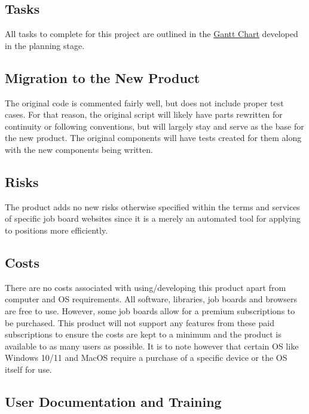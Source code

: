 \documentclass[12pt, titlepage]{article}
\begin{document}
\subsection{Tasks}

All tasks to complete for this project are outlined in the 
\href{https://gitlab.cas.mcmaster.ca/jamesong/application_3xa3_l01_grp05/-/tree/main/ProjectSchedule}{Gantt Chart} developed in the planning stage. 

\subsection{Migration to the New Product}

The original code is commented fairly well, but does not include proper test cases. For that reason, the original script will likely have parts rewritten for continuity or following conventions, but will largely stay and serve as the base for the new product. The original components will have tests created for them along with the new components being written.

\subsection{Risks}

The product adds no new risks otherwise specified within the terms and services of specific job board websites since it is a merely an automated tool for applying to positions more efficiently.

\subsection{Costs}

There are no costs associated with using/developing this product apart from computer and OS requirements. All software, libraries, job boards and browsers are free to use. However, some job boards allow for a premium subscriptions to be purchased. This product will not support any features from these paid subscriptions to ensure the costs are kept to a minimum and the product is available to as many users as possible. It is to note however that certain OS like Windows 10/11 and MacOS require a purchase of a specific device or the OS itself for use.

\subsection{User Documentation and Training}
\end{document}
